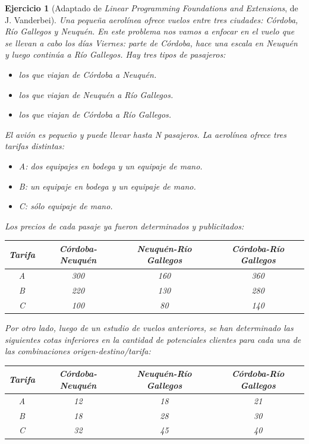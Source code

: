 \documentclass[a4paper,oneside,12pt]{amsart}
\newtheorem{quest}{Ejercicio}
\begin{document}
\begin{quest}
    [Adaptado de \textit{Linear Programming Foundations and Extensions}, de J. Vanderbei] Una pequeña aerolínea ofrece vuelos entre tres ciudades: Córdoba, Río Gallegos y Neuquén. En este problema nos vamos a enfocar en el vuelo que se llevan a cabo los días Viernes: parte de Córdoba, hace una escala en Neuquén y luego continúa a Río Gallegos. Hay tres tipos de pasajeros:
    \begin{itemize}
        \item los que viajan de Córdoba a Neuquén.
        \item los que viajan de Neuquén a Río Gallegos.
        \item los que viajan de Córdoba a Río Gallegos.
    \end{itemize}
    El avión es pequeño y puede llevar hasta N pasajeros. La aerolínea ofrece tres tarifas distintas:
    \begin{itemize}
        \item A: dos equipajes en bodega y un equipaje de mano.
        \item B: un equipaje en bodega y un equipaje de mano.
        \item C: sólo equipaje de mano.
    \end{itemize}
    Los precios de cada pasaje ya fueron determinados y publicitados:
    \begin{table}[h!]
        \centering
        \begin{tabular}{cccc}
            Tarifa & Córdoba-Neuquén & Neuquén-Río Gallegos & Córdoba-Río Gallegos \\ \midrule
            A & 300 & 160 & 360 \\
            B & 220 & 130 & 280 \\
            C & 100 & 80 & 140 \\
        \end{tabular}
    \end{table}
    
    Por otro lado, luego de un estudio de vuelos anteriores, se han determinado las siguientes cotas inferiores en la cantidad de potenciales clientes para cada una de las combinaciones origen-destino/tarifa:
    \begin{table}[h!]
        \centering
        \begin{tabular}{cccc}
            Tarifa & Córdoba-Neuquén & Neuquén-Río Gallegos & Córdoba-Río Gallegos \\ \midrule
            A & 12 & 18 & 21 \\
            B & 18 & 28 & 30 \\
            C & 32 & 45 & 40 \\
        \end{tabular}
    \end{table}
    

\end{quest}
\end{document}

